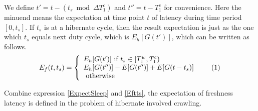 \documentclass[conference]{IEEEtran}
\newcommand\numberthis{\addtocounter{equation}{1}\tag{\theequation}}
\begin{document}
We define $t'=t-(t_s\bmod\Delta T^{c}_{1})$ and $t''=t-T^{c}_{1}$ for convenience. 
Here the minuend means the expectation at time point $t$ of latency during time period $[0, t_s]$.
If $t_s$ is at a hibernate cycle, then the result expectation is just as the one which $t_s$ equals next duty cycle, which is $E_h[G(t')]$, which can be written as follows.
\[E_f(t,t_s)=\left\{
    \begin{array}{lr}
    E_h[G(t')]\text{ if } t_s\in [T^{w}_{1}, T^{c}_{1})\\
    E_h[G(t'')]-E[G(t'')]+E[G(t-t_s)]\\
    \text{ otherwise }
    \end{array}\numberthis \label{Eftts}
    \right.
\]

Combine expression \eqref{ExpectSleep} and \eqref{Eftts}, the expectation of freshness latency is defined in the problem of hibernate involved crawling.
\end{document}
